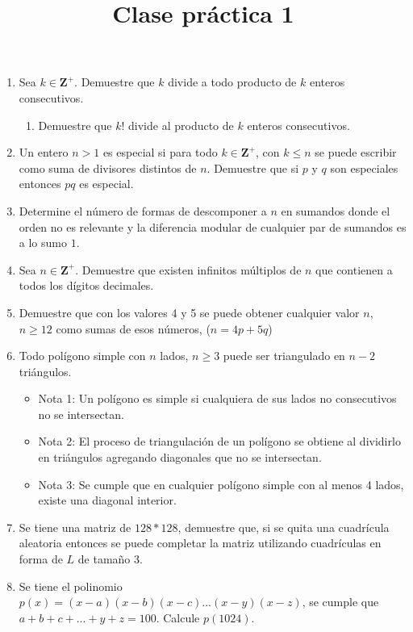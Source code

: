 \documentclass{article}
\begin{document}
\title{Clase pr\'actica 1}
\maketitle

\begin{enumerate}
    \item Sea $k \in \mathbf{Z^+}$. Demuestre que $k$ divide a todo producto de $k$ enteros consecutivos. 
    \begin{enumerate}
        \item Demuestre que $k!$ divide al producto de $k$ enteros consecutivos.
    \end{enumerate}
    \item Un entero $n>1$ es especial si para todo $k \in \mathbf{Z^+}$, con $k \leq n$ se puede escribir como suma de divisores distintos de $n$. Demuestre que si $p$ y $q$ son especiales entonces $pq$ es especial.
    \item Determine el n\'umero de formas de descomponer a $n$ en sumandos donde el orden no es relevante y la diferencia modular de cualquier par de sumandos es a lo sumo $1$.
   
    \item Sea  $n \in \mathbf{Z^+}$. Demuestre que existen infinitos m\'ultiplos de $n$ que contienen a todos los d\'igitos decimales.
    \item Demuestre que con los valores 4 y 5 se puede obtener cualquier valor $n$, $n\geq 12$ como sumas de esos números, ($n = 4p + 5q$)
    
    \item Todo polígono simple con $n$ lados, $n\ge3$ puede ser triangulado en $n-2$ triángulos.
    \begin{itemize}
        \item Nota 1: Un polígono es simple si cualquiera de sus lados no consecutivos no se intersectan.
        \item Nota 2: El proceso de triangulación de un polígono se obtiene al dividirlo en triángulos agregando diagonales que no se intersectan.
        \item Nota 3: Se cumple que en cualquier polígono simple con al menos 4 lados, existe una diagonal interior.
    \end{itemize}

     \item Se tiene una matriz de $128 * 128$, demuestre que, si se quita una cuadr\'icula aleatoria entonces se puede completar la matriz utilizando cuadr\'iculas en forma de $L$ de tamaño 3.

      \item Se tiene el polinomio $p(x) = (x-a)(x-b)(x-c)...(x-y)(x-z)$, se cumple que $a+b+c+...+y+z=100$. Calcule $p(1024)$.
\end{enumerate}
\end{document}
